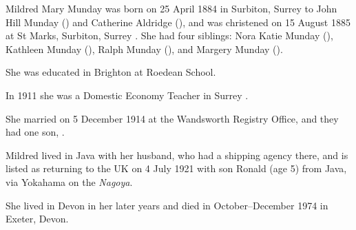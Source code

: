 
Mildred Mary Munday was born on 25 April 1884 in Surbiton, Surrey to  John Hill Munday () and Catherine Aldridge (), and was christened on 15 August 1885 at St Marks, Surbiton, Surrey \cite{MildredMundayBirth}. She had four siblings:  Nora Katie Munday (),  Kathleen Munday (), Ralph Munday (), and Margery Munday ().

She was educated in Brighton at Roedean School.

In 1911 she was a Domestic Economy Teacher in Surrey \cite{MildredMundayOccupation}.

She married  on 5 December 1914  at the Wandsworth Registry Office, and they had one son, .

Mildred lived in Java with her husband, who had a shipping agency there, and is listed as returning to the UK on 4 July 1921 with son Ronald (age 5) from Java, via Yokahama on the \emph{Nagoya}.\cite{MildredMundayTravel}

She lived in Devon in her later years and died in October--December 1974 in Exeter, Devon.\cite{MildredMundayDeath}
